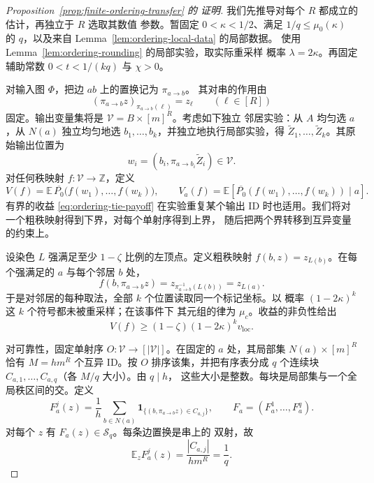 \begin{proof}[Proposition~\ref{prop:finite-ordering-transfer} 的
证明]
我们先推导对每个 \(R\) 都成立的估计，再独立于 \(R\) 选取其数值
参数。暂固定 \(0<\kappa<1/2\)、满足 \(1/q\le\mu_0(\kappa)\) 的
\(q\)，以及来自 Lemma~\ref{lem:ordering-local-data} 的局部数据。
使用 Lemma~\ref{lem:ordering-rounding} 的局部实验，取实际重采样
概率 \(\lambda=2\kappa\)。再固定辅助常数 \(0<t<1/(kq)\) 与
\(\chi>0\)。

对输入图 \(\Phi\)，把边 \(ab\) 上的置换记为 \(\pi_{a\to b}\)。
其对串的作用由
\[
 (\pi_{a\to b}z)_{\pi_{a\to b}(\ell)}=z_\ell
 \qquad(\ell\in[R])
\]
固定。输出变量集将是 \(\mathcal V=B\times[m]^R\)。考虑如下独立
邻居实验：从 \(A\) 均匀选 \(a\)，从 \(N(a)\) 独立均匀地选
\(b_1,\ldots,b_k\)，并独立地执行局部实验，得
\(\widetilde Z_1,\ldots,\widetilde Z_k\)。其原始输出位置为
\begin{equation}
 w_i=(b_i,\pi_{a\to b_i}\widetilde Z_i)\in\mathcal V.
\label{eq:ordering-iid-queries}
\end{equation}
对任何秩映射 \(f:\mathcal V\to\mathbb Z\)，定义
\[
 V(f)=\mathbb E\,
   \overline{P_0}\bigl(f(w_1),\ldots,f(w_k)\bigr),
 \qquad V_a(f)=\mathbb E[
   \overline{P_0}(f(w_1),\ldots,f(w_k))\mid a].
\]
有界的收益 \eqref{eq:ordering-tie-payoff} 在实验重复某个输出 ID
时也适用。我们将对一个粗秩映射得到下界，对每个单射序得到上界，
随后把两个界转移到互异变量的约束上。

设染色 \(L\) 强满足至少 \(1-\zeta\) 比例的左顶点。定义粗秩映射
\(f(b,z)=z_{L(b)}\)。在每个强满足的 \(a\) 与每个邻居 \(b\) 处，
\[
 f(b,\pi_{a\to b}z)=z_{\pi_{a\to b}^{-1}(L(b))}=z_{L(a)}.
\]
于是对邻居的每种取法，全部 \(k\) 个位置读取同一个标记坐标。以
概率 \((1-2\kappa)^k\) 这 \(k\) 个符号都未被重采样；在该事件下
其元组的律为 \(\mu_c\)。收益的非负性给出
\begin{equation}
 V(f)\ge (1-\zeta)(1-2\kappa)^k v_{\mathrm{loc}}.
\label{eq:ordering-iid-completeness}
\end{equation}

对可靠性，固定单射序 \(O:\mathcal V\to[|\mathcal V|]\)。在固定的
\(a\) 处，其局部集 \(N(a)\times[m]^R\) 恰有 \(M=hm^R\) 个互异
ID。按 \(O\) 排序该集，并把有序表分成 \(q\) 个连续块
\(C_{a,1},\ldots,C_{a,q}\)（各 \(M/q\) 大小）。由 \(q\mid h\)，
这些大小是整数。每块是局部集与一个全局秩区间的交。定义
\begin{equation}
 F_a^j(z)=\frac1h\sum_{b\in N(a)}
  \mathbf1_{\{(b,\pi_{a\to b}z)\in C_{a,j}\}},
 \qquad F_a=(F_a^1,\ldots,F_a^q).
\label{eq:ordering-block-functions}
\end{equation}
对每个 \(z\) 有 \(F_a(z)\in\mathcal S_q\)。每条边置换是串上的
双射，故
\begin{equation}
 \mathbb E_z F_a^j(z)=\frac{|C_{a,j}|}{hm^R}=\frac1q.
\label{eq:ordering-block-mass}
\end{equation}


\end{proof}
